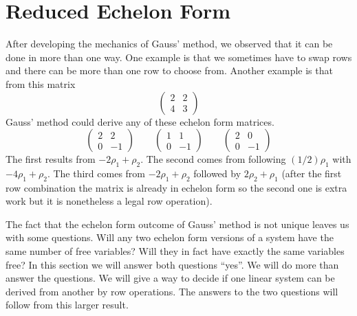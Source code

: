 \section{Reduced Echelon Form}
After developing the mechanics of Gauss' method, 
we observed that it can be done in more than one way.
One example is that we sometimes have to swap rows and there can be more than
one row to choose from.
Another example is that from this matrix 
\begin{equation*}
    \begin{pmatrix}
       2  &2  \\
       4  &3
    \end{pmatrix}
\end{equation*}
Gauss' method could derive any of these echelon form matrices.
\begin{equation*}
    \begin{pmatrix}
       2  &2  \\
       0  &-1
    \end{pmatrix}
    \qquad
    \begin{pmatrix}
       1  &1  \\
       0  &-1
    \end{pmatrix}
    \qquad
    \begin{pmatrix}
       2  &0  \\
       0  &-1
    \end{pmatrix}
\end{equation*}
The first results from $-2\rho_1+\rho_2$.
The second comes from following $(1/2)\rho_1$ with $-4\rho_1+\rho_2$.
The third comes
from $-2\rho_1+\rho_2$ followed by $2\rho_2+\rho_1$
(after the first row combination the matrix is already in
echelon form so the second one is extra work 
but it is nonetheless a legal row operation).

The fact that the echelon form outcome of Gauss' method 
is not unique leaves us with some questions.
Will any two echelon form versions of a system have the same number of
free variables?
Will they in fact have exactly the same variables free?
In this section we will answer both questions ``yes''.
We will do more than answer the questions.
We will give a way to decide if one linear system 
can be derived from another by row operations.
The answers to the two questions will follow from this larger result.









